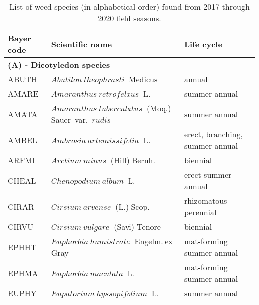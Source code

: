 \documentclass[
]{article}
\begin{document}
\begin{table}[H]

\caption{\label{tab:list-sp}List of weed species (in alphabetical order) found from 2017 through 2020 field seasons.}
\centering
\begin{tabular}[t]{l|l|l}
\hline
Bayer code & Scientific name & Life cycle\\
\hline
\multicolumn{3}{l}{\textbf{(A) - Dicotyledon species}}\\
\hline
\hspace{1em}ABUTH & $Abutilon~theophrasti$$~$ Medicus & annual\\
 
\hspace{1em}AMARE & $Amaranthus~retrofelxus$$~$ L. & summer annual\\
 
\hspace{1em}AMATA & $Amaranthus~tuberculatus$$~$ (Moq.) Sauer~var.~$rudis$ & summer annual\\
 
\hspace{1em}AMBEL & $Ambrosia~artemissifolia$$~$ L. & erect, branching, summer annual\\
 
\hspace{1em}ARFMI & $Arctium~minus$$~$ (Hill) Bernh. & biennial\\
 
\hspace{1em}CHEAL & $Chenopodium~album$$~$ L. & erect summer annual\\
 
\hspace{1em}CIRAR & $Cirsium~arvense$$~$ (L.) Scop. & rhizomatous perennial\\
 
\hspace{1em}CIRVU & $Cirsium~vulgare$$~$ (Savi) Tenore & biennial\\
 
\hspace{1em}EPHHT & $Euphorbia~humistrata$$~$ Engelm.$~$ex$~$Gray & mat-forming summer annual\\
 
\hspace{1em}EPHMA & $Euphorbia~maculata$$~$ L. & mat-forming summer annual\\
 
\hspace{1em}EUPHY & $Eupatorium~hyssopifolium$$~$ L. & summer annual\\
 

\end{tabular}
\end{table}
\end{document}
